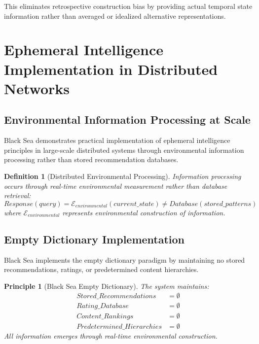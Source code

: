 \documentclass[12pt,a4paper]{article}
\newtheorem{definition}{Definition}
\newtheorem{principle}{Principle}
\begin{document}
This eliminates retrospective construction bias by providing actual temporal state information rather than averaged or idealized alternative representations.

\section{Ephemeral Intelligence Implementation in Distributed Networks}

\subsection{Environmental Information Processing at Scale}

Black Sea demonstrates practical implementation of ephemeral intelligence principles in large-scale distributed systems through environmental information processing rather than stored recommendation databases.

\begin{definition}[Distributed Environmental Processing]
Information processing occurs through real-time environmental measurement rather than database retrieval:
\begin{equation}
Response(query) = \mathcal{E}_{environmental}(current\_state) \not= Database(stored\_patterns)
\end{equation}
where $\mathcal{E}_{environmental}$ represents environmental construction of information.
\end{definition}

\subsection{Empty Dictionary Implementation}

Black Sea implements the empty dictionary paradigm by maintaining no stored recommendations, ratings, or predetermined content hierarchies.

\begin{principle}[Black Sea Empty Dictionary]
The system maintains:
\begin{align}
Stored\_Recommendations &= \emptyset \\
Rating\_Database &= \emptyset \\
Content\_Rankings &= \emptyset \\
Predetermined\_Hierarchies &= \emptyset
\end{align}
All information emerges through real-time environmental construction.
\end{principle}
\end{document}
